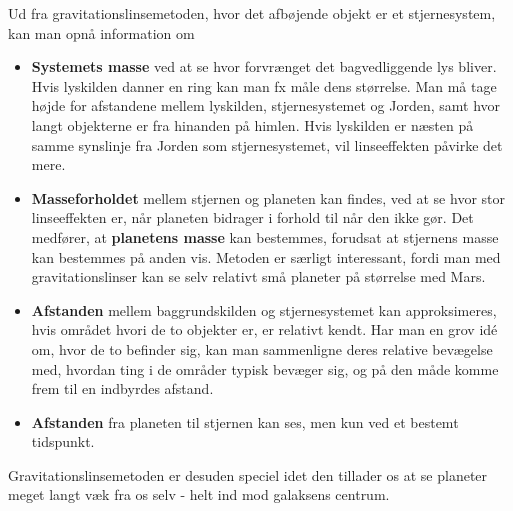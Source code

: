 Ud fra gravitationslinsemetoden, hvor det afbøjende objekt er et stjernesystem, kan man opnå information om
\begin{itemize}
    \item \textbf{Systemets masse} ved at se hvor forvrænget det bagvedliggende lys bliver. Hvis lyskilden danner en ring kan man fx måle dens størrelse. Man må tage højde for afstandene mellem lyskilden, stjernesystemet og Jorden, samt hvor langt objekterne er fra hinanden på himlen. Hvis lyskilden er næsten på samme synslinje fra Jorden som stjernesystemet, vil linseeffekten påvirke det mere.
    \item \textbf{Masseforholdet} mellem stjernen og planeten kan findes, ved at se hvor stor linseeffekten er, når planeten bidrager i forhold til når den ikke gør. Det medfører, at \textbf{planetens masse} kan bestemmes, forudsat at stjernens masse kan bestemmes på anden vis. Metoden er særligt interessant, fordi man med gravitationslinser kan se selv relativt små planeter på størrelse med Mars.
    \item \textbf{Afstanden} mellem baggrundskilden og stjernesystemet kan approksimeres, hvis området hvori de to objekter er, er relativt kendt. Har man en grov idé om, hvor de to befinder sig, kan man sammenligne deres relative bevægelse med, hvordan ting i de områder typisk bevæger sig, og på den måde komme frem til en indbyrdes afstand.
    \item \textbf{Afstanden} fra planeten til stjernen kan ses, men kun ved et bestemt tidspunkt. %
\end{itemize}

Gravitationslinsemetoden er desuden speciel idet den tillader os at se planeter meget langt væk fra os selv - helt ind mod galaksens centrum.

